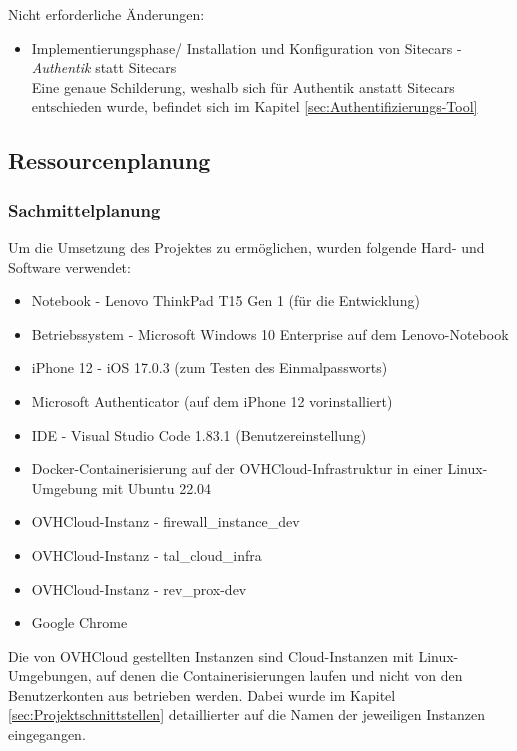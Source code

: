 Nicht erforderliche Änderungen:
\begin{itemize} [label=--]
	\item Implementierungsphase/ Installation und Konfiguration von Sitecars - \textit{Authentik} statt Sitecars
	\\Eine genaue Schilderung, weshalb sich für Authentik anstatt Sitecars entschieden wurde, befindet sich im 
	Kapitel \ref*{sec:Authentifizierungs-Tool} 
\end{itemize}


\subsection{Ressourcenplanung}
\label{sec:Ressourcenplanung}

\subsubsection{Sachmittelplanung}
\label{sec:Sachmittelplanung}
Um die Umsetzung des Projektes zu ermöglichen, wurden folgende Hard- und Software verwendet:
\begin{itemize} [label=--]
	\item Notebook - Lenovo ThinkPad T15 Gen 1 (für die Entwicklung)
	\item Betriebssystem - Microsoft Windows 10 Enterprise auf dem Lenovo-Notebook
	\item iPhone 12 - iOS 17.0.3 (zum Testen des Einmalpassworts)
	\item Microsoft Authenticator (auf dem iPhone 12 vorinstalliert)
	\item \acs{IDE} - Visual Studio Code 1.83.1 (Benutzereinstellung)
	\item Docker-Containerisierung auf der OVHCloud-Infrastruktur in einer Linux-Umgebung mit Ubuntu 22.04
	\item OVHCloud-Instanz - firewall\_instance\_dev
	\item OVHCloud-Instanz - tal\_cloud\_infra
	\item OVHCloud-Instanz - rev\_prox-dev
	\item Google Chrome
\end{itemize}
Die von OVHCloud gestellten Instanzen sind Cloud-Instanzen mit Linux-Umgebungen, auf denen 
die Containerisierungen laufen und nicht von den Benutzerkonten aus betrieben werden. Dabei wurde im Kapitel 
\ref{sec:Projektschnittstellen}  detaillierter auf die Namen der jeweiligen 
Instanzen eingegangen.


